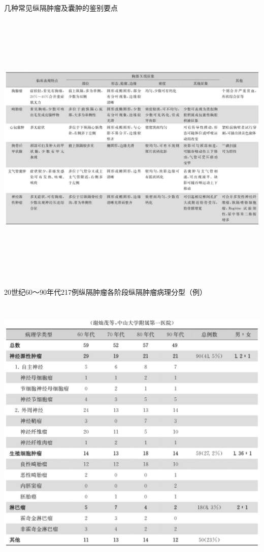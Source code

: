 \begin{table}[htbp]
\centering
\caption{几种常见纵隔肿瘤及囊肿的鉴别要点}
\label{tab7-3}
\includegraphics[width=8.76042in,height=5.29167in]{./images/Image00060.jpg}
\end{table}

\begin{table}[htbp]
\centering
\caption{20世纪60～90年代217例纵隔肿瘤各阶段纵隔肿瘤病理分型（例）}
\label{tab7-4}
\includegraphics[width=5.91667in,height=5.30208in]{./images/Image00061.jpg}
\end{table}

